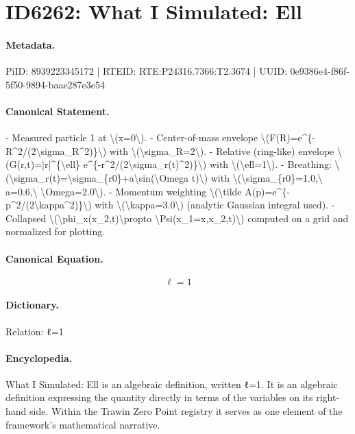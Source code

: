 \section*{ID6262: What I Simulated: Ell}
\paragraph{Metadata.}
PiID: 8939223345172 | RTEID: RTE:P24316.7366:T2.3674 | UUID: 0e9386e4-f86f-5f50-9894-baae287e3e54

\paragraph{Canonical Statement.}
- Measured particle 1 at \textbackslash{}(x=0\textbackslash{}). - Center-of-mass envelope \textbackslash{}(F(R)=e\textasciicircum{}\{-R\textasciicircum{}2/(2\textbackslash{}sigma\_R\textasciicircum{}2)\}\textbackslash{}) with \textbackslash{}(\textbackslash{}sigma\_R=2\textbackslash{}). - Relative (ring-like) envelope \textbackslash{}(G(r,t)=|r|\textasciicircum{}\{\textbackslash{}ell\} e\textasciicircum{}\{-r\textasciicircum{}2/(2\textbackslash{}sigma\_r(t)\textasciicircum{}2)\}\textbackslash{}) with \textbackslash{}(\textbackslash{}ell=1\textbackslash{}). - Breathing: \textbackslash{}(\textbackslash{}sigma\_r(t)=\textbackslash{}sigma\_\{r0\}+a\textbackslash{}sin(\textbackslash{}Omega t)\textbackslash{}) with \textbackslash{}(\textbackslash{}sigma\_\{r0\}=1.0,\textbackslash{} a=0.6,\textbackslash{} \textbackslash{}Omega=2.0\textbackslash{}). - Momentum weighting \textbackslash{}(\textbackslash{}tilde A(p)=e\textasciicircum{}\{-p\textasciicircum{}2/(2\textbackslash{}kappa\textasciicircum{}2)\}\textbackslash{}) with \textbackslash{}(\textbackslash{}kappa=3.0\textbackslash{}) (analytic Gaussian integral used). - Collapsed \textbackslash{}(\textbackslash{}phi\_x(x\_2,t)\textbackslash{}propto \textbackslash{}Psi(x\_1=x,x\_2,t)\textbackslash{}) computed on a grid and normalized for plotting.

\paragraph{Canonical Equation.}
\[
\ell=1
\]

\paragraph{Dictionary.}
Relation: ℓ=1

\paragraph{Encyclopedia.}
What I Simulated: Ell is an algebraic definition, written ℓ=1. It is an algebraic definition expressing the quantity directly in terms of the variables on its right-hand side. Within the Trawin Zero Point registry it serves as one element of the framework's mathematical narrative.
